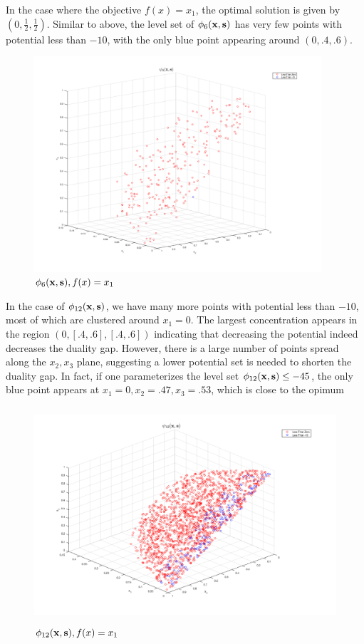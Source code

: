 \documentclass[answers]{exam}
\newcommand\x{{\bf x}}
\newcommand\s{{\bf s}}
\begin{document}
\begin{framed}
    
In the case where the objective $f(x) = x_1$, the optimal solution is given by $(0,\frac{1}{2},\frac{1}{2})$. Similar to above, the level set of $\phi_6(\x,\s)$ has very few points with potential less than $-10$, with the only blue point appearing around $(0,.4,.6)$.  

    \begin{figure}[H]
    \centering
    \caption{ $\phi_6(\x, \s),  f(x) = x_1$}
    \includegraphics[width=\linewidth, height=8cm]{TF6_2.png}
    \end{figure} 
    
In the case of $\phi_{12}(\x,\s)$, we have many more points with potential less than $-10$, most of which are clustered around $x_1 = 0$. The largest concentration appears in the region $(0, [.4,.6], [.4,.6])$ indicating that decreasing the potential indeed decreases the duality gap. However, there is a large number of points spread along the $x_2, x_3$ plane, suggesting a lower potential set is needed to shorten the duality gap. In fact, if one parameterizes the level set $\phi_{12}(\x,\s) \leq -45$, the only blue point appears at $x_1 = 0, x_2 = .47, x_3 = .53$, which is close to the opimum  
        \begin{figure}[H]
    \centering
        \caption{ $\phi_{12}(\x, \s), f(x) = x_1$}
    \includegraphics[width=\linewidth, height=8cm]{TF12_2.png}
\end{figure}

\end{framed}
\end{document}
